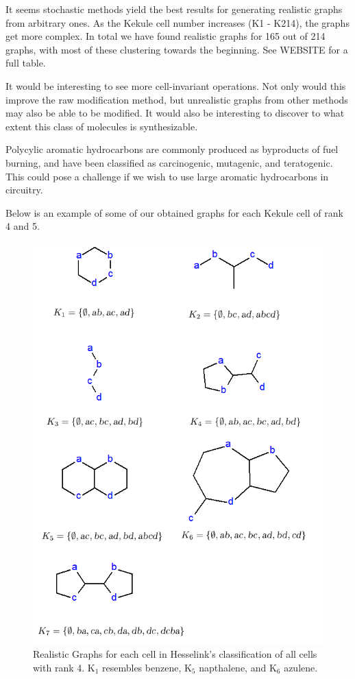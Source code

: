 \documentclass[12pt]{article}
\begin{document}
It seems stochastic methods yield the best results for generating realistic graphs from arbitrary ones. As the Kekule cell number increases (K1 - K214), the graphs get more complex. In total we have found realistic graphs for 165 out of 214 graphs, with most of these clustering towards the beginning. See WEBSITE for a full table.

It would be interesting to see more cell-invariant operations. Not only would this improve the raw modification method, but unrealistic graphs from other methods may also be able to be modified. It would also be interesting to discover to what extent this class of molecules is synthesizable. 

Polycylic aromatic hydrocarbons are commonly produced as byproducts of fuel burning, and have been classified as carcinogenic, mutagenic, and teratogenic. This could pose a challenge if we wish to use large aromatic hydrocarbons in circuitry. 

Below is an example of some of our obtained graphs for each Kekule cell of rank 4 and 5.

\clearpage

\begin{figure}[ht!]
\centering
\includegraphics[width=130mm]{rank4Results.png}
\caption{Realistic Graphs for each cell in Hesselink's classification of all cells with rank 4. K$_1$ resembles benzene, K$_5$ napthalene, and K$_6$ azulene.}
\label{fig:rank4Results}
\end{figure}
\end{document}
